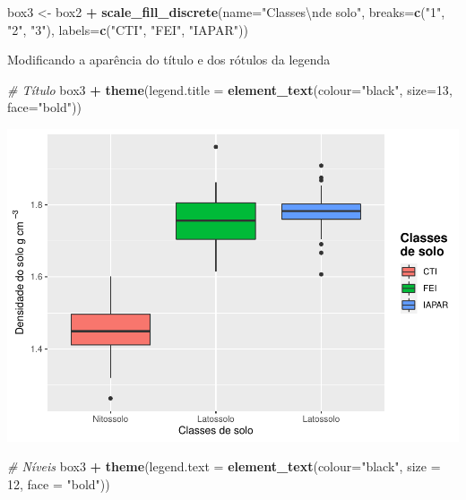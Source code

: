 \documentclass[]{book}
\newenvironment{Shaded}{\begin{snugshade}}{\end{snugshade}}
\newcommand{\CharTok}[1]{\textcolor[rgb]{0.31,0.60,0.02}{#1}}
\newcommand{\CommentTok}[1]{\textcolor[rgb]{0.56,0.35,0.01}{\textit{#1}}}
\newcommand{\DataTypeTok}[1]{\textcolor[rgb]{0.13,0.29,0.53}{#1}}
\newcommand{\DecValTok}[1]{\textcolor[rgb]{0.00,0.00,0.81}{#1}}
\newcommand{\KeywordTok}[1]{\textcolor[rgb]{0.13,0.29,0.53}{\textbf{#1}}}
\newcommand{\NormalTok}[1]{#1}
\newcommand{\OperatorTok}[1]{\textcolor[rgb]{0.81,0.36,0.00}{\textbf{#1}}}
\newcommand{\StringTok}[1]{\textcolor[rgb]{0.31,0.60,0.02}{#1}}
\begin{document}
\begin{Shaded}
\begin{Highlighting}[]
\NormalTok{box3 <-}\StringTok{ }\NormalTok{box2 }\OperatorTok{+}
\StringTok{        }\KeywordTok{scale_fill_discrete}\NormalTok{(}\DataTypeTok{name=}\StringTok{"Classes}\CharTok{\textbackslash{}n}\StringTok{de solo"}\NormalTok{,}
                          \DataTypeTok{breaks=}\KeywordTok{c}\NormalTok{(}\StringTok{"1"}\NormalTok{, }\StringTok{"2"}\NormalTok{, }\StringTok{"3"}\NormalTok{),}
                          \DataTypeTok{labels=}\KeywordTok{c}\NormalTok{(}\StringTok{"CTI"}\NormalTok{, }\StringTok{"FEI"}\NormalTok{, }\StringTok{"IAPAR"}\NormalTok{))}
\end{Highlighting}
\end{Shaded}

Modificando a aparência do título e dos rótulos da legenda

\begin{Shaded}
\begin{Highlighting}[]
\CommentTok{# Título}
\NormalTok{box3 }\OperatorTok{+}\StringTok{ }\KeywordTok{theme}\NormalTok{(}\DataTypeTok{legend.title =} \KeywordTok{element_text}\NormalTok{(}\DataTypeTok{colour=}\StringTok{"black"}\NormalTok{, }\DataTypeTok{size=}\DecValTok{13}\NormalTok{, }\DataTypeTok{face=}\StringTok{"bold"}\NormalTok{))}
\end{Highlighting}
\end{Shaded}

\includegraphics{TudodoR_files/figure-latex/unnamed-chunk-213-1.pdf}

\begin{Shaded}
\begin{Highlighting}[]
\CommentTok{# Níveis}
\NormalTok{box3 }\OperatorTok{+}\StringTok{ }\KeywordTok{theme}\NormalTok{(}\DataTypeTok{legend.text =} \KeywordTok{element_text}\NormalTok{(}\DataTypeTok{colour=}\StringTok{"black"}\NormalTok{, }\DataTypeTok{size =} \DecValTok{12}\NormalTok{, }\DataTypeTok{face =} \StringTok{"bold"}\NormalTok{))}
\end{Highlighting}
\end{Shaded}
\end{document}
